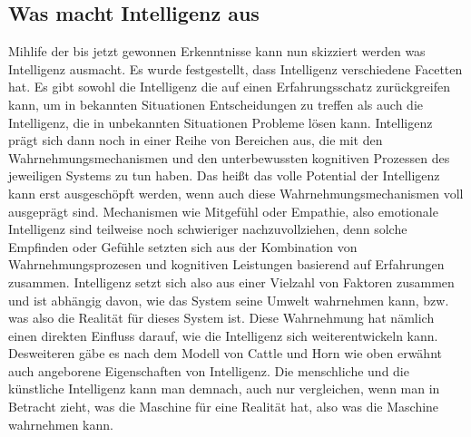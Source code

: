 \documentclass[a4paper, 11pt]{scrartcl}
\begin{document}
\subsection{Was macht Intelligenz aus}
Mihlife der bis jetzt gewonnen Erkenntnisse kann nun skizziert werden was Intelligenz ausmacht. Es wurde festgestellt, dass Intelligenz verschiedene Facetten hat. Es gibt sowohl die Intelligenz die auf einen Erfahrungsschatz zurückgreifen kann, um in bekannten Situationen Entscheidungen zu treffen als auch die Intelligenz, die in unbekannten Situationen Probleme lösen kann. Intelligenz prägt sich dann noch in einer Reihe von Bereichen aus, die mit den Wahrnehmungsmechanismen und den unterbewussten kognitiven Prozessen des jeweiligen Systems zu tun haben. Das heißt das volle Potential der Intelligenz kann erst ausgeschöpft werden, wenn auch diese Wahrnehmungsmechanismen voll ausgeprägt sind. Mechanismen wie Mitgefühl oder Empathie, also emotionale Intelligenz sind teilweise noch schwieriger nachzuvollziehen, denn solche Empfinden oder Gefühle setzten sich aus der Kombination von Wahrnehmungsprozesen und kognitiven Leistungen basierend auf Erfahrungen zusammen. Intelligenz setzt sich also aus einer Vielzahl von Faktoren zusammen und ist abhängig davon, wie das System seine Umwelt wahrnehmen kann, bzw. was also die Realität für dieses System ist. Diese Wahrnehmung hat nämlich einen direkten Einfluss darauf, wie die Intelligenz sich weiterentwickeln kann. Desweiteren gäbe es nach dem Modell von Cattle und Horn wie oben erwähnt auch angeborene Eigenschaften von Intelligenz. Die menschliche und die künstliche Intelligenz kann man demnach, auch nur vergleichen, wenn man in Betracht zieht, was die Maschine für eine Realität hat, also was die Maschine wahrnehmen kann.
\end{document}
